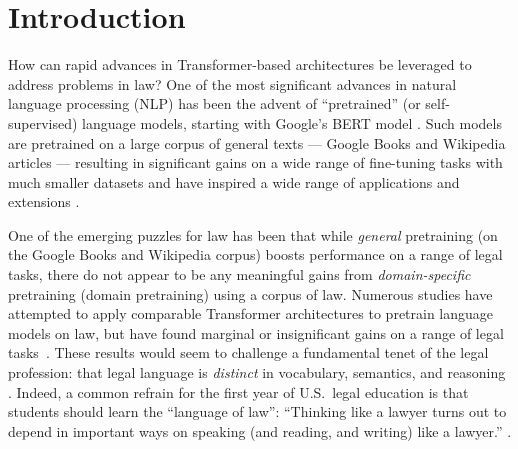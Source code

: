 \documentclass[sigconf]{acmart}
\begin{document}




\maketitle

\section{Introduction}

How can rapid advances in Transformer-based architectures be leveraged to address problems in law?  One of the most significant advances in natural language processing (NLP) has been the advent of ``pretrained'' (or self-supervised) language models, starting with Google's BERT model \cite{devlin-etal-2019-bert}. Such models are pretrained on a large corpus of general texts --- Google Books and Wikipedia articles --- resulting in significant gains on a wide range of fine-tuning tasks with much smaller datasets and have inspired a wide range of applications and extensions \cite{liu2019roberta, rogers2021primer}. 

One of the emerging puzzles for law has been that while \emph{general} pretraining (on the Google Books and Wikipedia corpus) boosts performance on a range of legal tasks, there do not appear to be any meaningful gains from \emph{domain-specific} pretraining (domain pretraining) using a corpus of law. Numerous studies have attempted to apply comparable Transformer architectures to pretrain language models on law, but have found marginal or insignificant gains on a range of legal tasks~\cite{chalkidis-etal-2020-legal, Elwany2019, zhong2020does, zhong2020jec}.  These results would seem to challenge a fundamental tenet of the legal profession: that legal language is \emph{distinct} in vocabulary, semantics, and reasoning \cite{mellinkoff2004language,mertz2007language, tiersma1999legal}.  Indeed, a common refrain for the first year of U.S.\ legal education is that students should learn the ``language of law'': ``Thinking like a lawyer turns out to
depend in important ways on speaking (and reading, and writing) like a lawyer.'' \cite{mertz2007language}.
\end{document}
